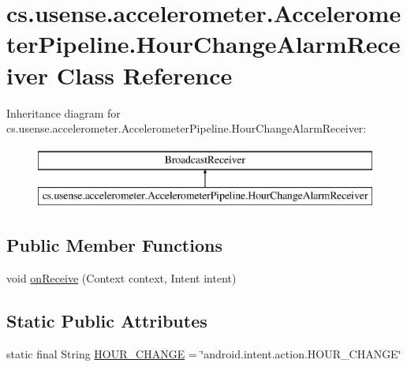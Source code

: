 \hypertarget{classcs_1_1usense_1_1accelerometer_1_1_accelerometer_pipeline_1_1_hour_change_alarm_receiver}{}\section{cs.\+usense.\+accelerometer.\+Accelerometer\+Pipeline.\+Hour\+Change\+Alarm\+Receiver Class Reference}
\label{classcs_1_1usense_1_1accelerometer_1_1_accelerometer_pipeline_1_1_hour_change_alarm_receiver}
Inheritance diagram for cs.\+usense.\+accelerometer.\+Accelerometer\+Pipeline.\+Hour\+Change\+Alarm\+Receiver\+:\begin{figure}[H]
\begin{center}
\leavevmode
\includegraphics[height=2.000000cm]{classcs_1_1usense_1_1accelerometer_1_1_accelerometer_pipeline_1_1_hour_change_alarm_receiver}
\end{center}
\end{figure}
\subsection*{Public Member Functions}
\begin{DoxyCompactItemize}
\item 
void \hyperlink{classcs_1_1usense_1_1accelerometer_1_1_accelerometer_pipeline_1_1_hour_change_alarm_receiver_a634a849342816e74e426c03087674578}{on\+Receive} (Context context, Intent intent)
\end{DoxyCompactItemize}
\subsection*{Static Public Attributes}
\begin{DoxyCompactItemize}
\item 
static final String \hyperlink{classcs_1_1usense_1_1accelerometer_1_1_accelerometer_pipeline_1_1_hour_change_alarm_receiver_a193681af2b8dcefcd9fd5f1591c8cf17}{H\+O\+U\+R\+\_\+\+C\+H\+A\+N\+G\+E} = \char`\"{}android.\+intent.\+action.\+H\+O\+U\+R\+\_\+\+C\+H\+A\+N\+G\+E\char`\"{}
\end{DoxyCompactItemize}


